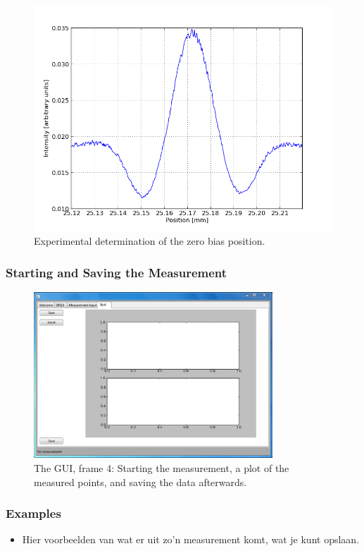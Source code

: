 \begin{figure}[!ht]
 \begin{center}
  \includegraphics[width=\textwidth]{figures/peakposition}
  \caption{Experimental determination of the zero bias position.}
  \label{fig:peakposition}
 \end{center}
\end{figure}


\subsubsection{Starting and Saving the Measurement}\label{subsub:saving}

\begin{figure}[!ht]
 \begin{center}
  \includegraphics[width=0.8\textwidth]{figures/gui4}
  \caption{The GUI, frame 4: Starting the measurement, a plot of the measured points, and saving the data afterwards.}
  \label{fig:gui4}
 \end{center}
\end{figure}

\subsubsection{Examples}
\begin{itemize}
 \item Hier voorbeelden van wat er uit zo'n measurement komt, wat je kunt opslaan.
\end{itemize}

